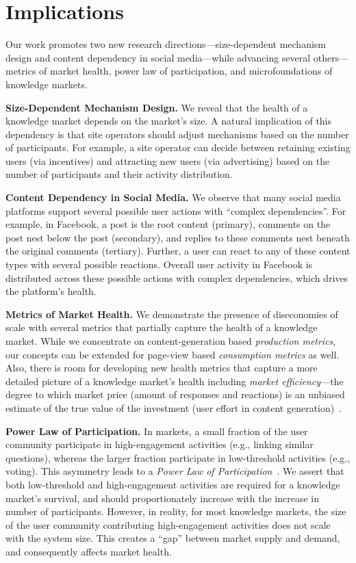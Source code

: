 \section{Implications}
Our work promotes two new research directions---size-dependent mechanism design and content dependency in social media---while advancing several others---metrics of market health, power law of participation, and microfoundations of knowledge markets. 

\textbf{Size-Dependent Mechanism Design.} We reveal that the health of a knowledge market depends on the market's size. A natural implication of this dependency is that site operators should adjust mechanisms based on the number of participants. For example, a site operator can decide between retaining existing users (via incentives) and attracting new users (via advertising) based on the number of participants and their activity distribution.

\textbf{Content Dependency in Social Media.} We observe that many social media platforms support several possible user actions with ``complex dependencies''. For example, in Facebook, a post is the root content (primary), comments on the post nest below the post (secondary), and replies to these comments nest beneath the original comments (tertiary). Further, a user can react to any of these content types with several possible reactions. Overall user activity in Facebook is distributed across these possible actions with complex dependencies, which drives the platform's health.

\textbf{Metrics of Market Health.} We demonstrate the presence of diseconomies of scale with several metrics that partially capture the health of a knowledge market. While we concentrate on content-generation based \emph{production metrics}, our concepts can be extended for page-view based \emph{consumption metrics} as well. Also, there is room for developing new health metrics that capture a more detailed picture of a knowledge market's health including \emph{market efficiency}---the degree to which market price (amount of responses and reactions) is an unbiased estimate of the true value of the investment (user effort in content generation)~\cite{damodaran2002}.

\textbf{Power Law of Participation.} In  markets, a small fraction of the user community participate in high-engagement activities (e.g., linking similar questions), whereas the larger fraction participate in low-threshold activities (e.g., voting). This asymmetry leads to a \emph {Power Law of Participation}~\cite{mayfield2006}. We assert that both low-threshold and high-engagement activities are required for a knowledge market's survival, and should proportionately increase with the increase in number of participants. However, in reality, for most knowledge markets, the size of the user community contributing high-engagement activities does not scale with the system size. This creates a ``gap'' between market supply and demand, and consequently affects market health. 

